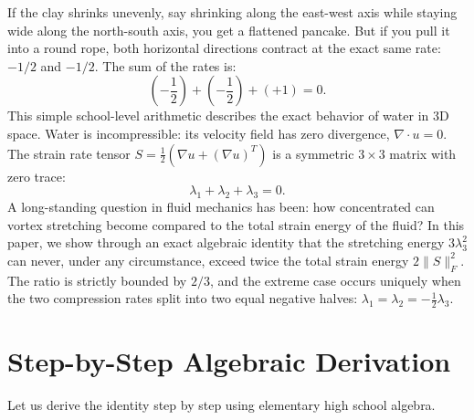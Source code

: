 \documentclass[11pt,a4paper]{article}
\theoremstyle{definition}
\begin{document}
If the clay shrinks unevenly, say shrinking along the east-west axis while staying wide along the north-south axis, you get a flattened pancake. But if you pull it into a round rope, both horizontal directions contract at the exact same rate: $-1/2$ and $-1/2$. The sum of the rates is:
\begin{equation}
\left(-\frac{1}{2}\right) + \left(-\frac{1}{2}\right) + (+1) = 0.
\end{equation}
This simple school-level arithmetic describes the exact behavior of water in 3D space. Water is incompressible: its velocity field has zero divergence, $\nabla \cdot u = 0$. The strain rate tensor $S = \frac{1}{2}(\nabla u + (\nabla u)^T)$ is a symmetric $3 \times 3$ matrix with zero trace:
\begin{equation}
\lambda_1 + \lambda_2 + \lambda_3 = 0.
\end{equation}
A long-standing question in fluid mechanics has been: how concentrated can vortex stretching become compared to the total strain energy of the fluid? In this paper, we show through an exact algebraic identity that the stretching energy $3\lambda_3^2$ can never, under any circumstance, exceed twice the total strain energy $2\|S\|_F^2$. The ratio is strictly bounded by $2/3$, and the extreme case occurs uniquely when the two compression rates split into two equal negative halves: $\lambda_1 = \lambda_2 = -\frac{1}{2}\lambda_3$.


\section{Step-by-Step Algebraic Derivation}

Let us derive the identity step by step using elementary high school algebra.
\end{document}
